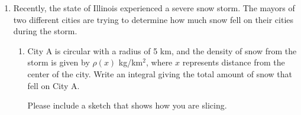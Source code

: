 \documentclass{article}
\begin{document}
\begin{enumerate}
\begin{enumerate}
  \item
    \begin{problem}
      If $H (x) = \displaystyle \int_{1}^x f(t) \,dt$, then $H(x)$ is
      increasing on $[-3, 7]$.
    \end{problem}


    \begin{solution}
      $H$ is increasing when $H' > 0$; since $H(x)$ is just
        the area function $_1 A_f$, $H' = f$, which is $> 0$ only for $x >
        1$.

    \end{solution}

  \end{enumerate}
  \pspace{\newpage}
  \probonly{\newpage}

\item \label{spring2011-1b-midterm1-snow-density-modified} %

  Recently, the state of Illinois experienced a severe snow storm.  The
  mayors of two different cities are trying to determine how much snow
  fell on their cities during the storm.

  \begin{enumerate}
  \item \label{spring2011-midterm1-snow-density-circle}
    \begin{problem}[2.65in]
      City A is circular with a radius of 5 km, and the density of snow
      from the storm is given by $\rho(x)$ kg/km$^2$, where $x$ represents
      distance from the center of the city.  Write an integral giving the
      total amount of snow that fell on City A.

      Please include a sketch that shows how you are slicing. 
    \end{problem}


\end{enumerate}
\end{enumerate}
\end{document}
